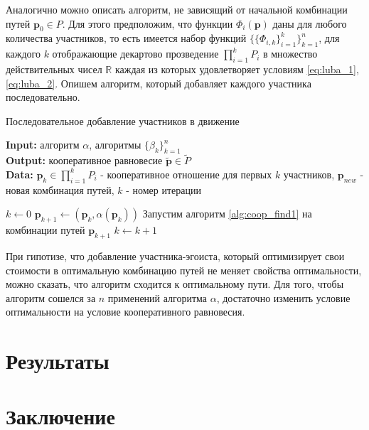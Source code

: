 \documentclass[12pt, a4paper]{article}
\begin{document}
Аналогично можно описать алгоритм, не зависящий от начальной комбинации путей $\textbf{p}_0 \in P$. Для этого предположим, что функции $\Phi_i (\textbf{p})$ даны для любого количества участников, то есть имеется набор функций $\{\{\Phi_{i, k} \}_{i = 1}^k\}_{k = 1}^n$, для каждого $k$ отображающие декартово прозведение $\prod\limits_{i = 1}^kP_i$ в множество действительных чисел $\mathbb{R}$ каждая из которых удовлетворяет условиям \eqref{eq:luba_1}, \eqref{eq:luba_2}. Опишем алгоритм, который добавляет каждого участника последовательно.


\begin{algorithm}[!hpt]
	\caption{Последовательное добавление участников в движение}
	\label{alg:coop_find2}
	{\bf {Input:}} алгоритм $\alpha$, алгоритмы $\{\beta_k\}_{k = 1}^n$\\
	{\bf {Output:}} кооперативное равновесие $\widetilde{\textbf{p}} \in \widetilde{P}$\\
	{\bf {Data:}} $\textbf{p}_{k} \in \prod\limits_{i = 1}^kP_i$ - кооперативное отношение для первых $k$ участников, $\textbf{p}_{new}$ - новая комбинация путей, $k$ - номер итерации
	\begin{algorithmic}[1]
		\State $k \gets 0$
		\State $\textbf{p}_{k + 1} \gets (\textbf{p}_{k}, \alpha (\textbf{p}_{k}))$
		\State Запустим алгоритм \ref {alg:coop_find1} на комбинации путей $\textbf{p}_{k + 1}$
		\State $k \gets k + 1$
		\EndWhile
	\end{algorithmic}
\end{algorithm}

При гипотизе, что добавление участника-эгоиста, который оптимизирует свои стоимости в оптимальную комбинацию путей не меняет свойства оптимальности, можно сказать, что алгоритм сходится к оптимальному пути. Для того, чтобы алгоритм сошелся за $n$ применений алгоритма $\alpha$, достаточно изменить условие оптимальности на условие кооперативного равновесия.


\newpage
\section{Результаты}

\newpage
\section{Заключение}
\end{document}
